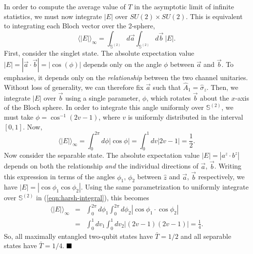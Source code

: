 In order to compute the average value of $T$ in the asymptotic limit of infinite statistics, we must now integrate $|E|$ over $SU(2)\times SU(2)$. This is equivalent to integrating each Bloch vector over the 2-sphere,
\begin{equation}
    \langle |E| \rangle_\infty = \int_{\mathbb{S}^{(2)}} d \vec{a}  \int_{\mathbb{S}^{(2)}} d \vec{b}  ~ |E|.
    \label{eqn:harsh-integral}
\end{equation}
First, consider the singlet state. The absolute expectation value $|E| = |\vec{a} \cdot \vec{b}| = |\cos(\phi)|$ depends only on the angle $\phi$ between $\vec{a}$ and $\vec{b}$. To emphasise, it depends only on the \emph{relationship} between the two channel unitaries. Without loss of generality, we can therefore fix $\vec{a}$ such that $\hat{A}_1 = \hat{\sigma}_z$. Then, we integrate $|E|$ over $\vec{b}$ using a single parameter, $\phi$, which rotates $\vec{b}$ about the $x$-axis of the Bloch sphere. In order to integrate this angle uniformly over $\mathbb{S}^{(2)}$, we must take $\phi = \cos^{-1}(2v-1)$, where $v$ is uniformly distributed in the interval $\left[0, 1 \right]$. Now,
\begin{equation}
    \langle |E| \rangle_\infty = \int_{0}^{2\pi} d \phi |\cos \phi| = \int_{0}^{1} dv |2v-1| = \frac{1}{2}.
\end{equation}
Now consider the separable state. The absolute expectation value $|E| = |a^{z} \cdot b^{z}|$ depends on both the relationship \emph{and} the individual directions of $\vec{a}$, $\vec{b}$. Writing this expression in terms of the angles $\phi_1$, $\phi_2$ between $\hat{z}$ and $\vec{a}$, $\vec{b}$ respectively, we have $|E| = |\cos \phi_1 \cos \phi_2|$. Using the same parametrization to uniformly integrate over $\mathbb{S}^{(2)}$ in (\ref{eqn:harsh-integral}), this becomes
\begin{eqnarray}
   \langle |E| \rangle_\infty &=& \int_{0}^{2\pi} d \phi_1 \int_{0}^{2\pi} d \phi_2 |\cos \phi_1 \cdot \cos \phi_2|\\  
             &=& \int_{0}^{1} dv_1 \int_{0}^{1} dv_2 |(2v-1)(2v-1)| = \frac{1}{4}.
\end{eqnarray}
So, all maximally entangled two-qubit states have $\bar{T}=1/2$ and all separable states have $\bar{T}=1/4$.
$\hfill\blacksquare$
\vspace{5mm}

